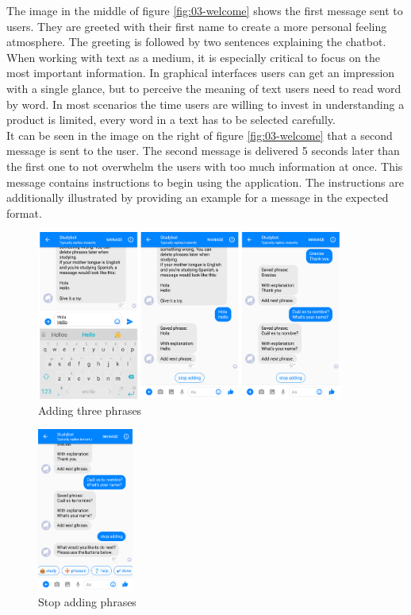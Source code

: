The image in the middle of figure \ref{fig:03-welcome} shows the first message sent to users.
They are greeted with their first name to create a more personal feeling atmosphere.
The greeting is followed by two sentences explaining the chatbot.
\\

When working with text as a medium, it is especially critical to focus on the most important information.
In graphical interfaces users can get an impression with a single glance,
but to perceive the meaning of text users need to read word by word.
In most scenarios the time users are willing to invest in understanding a product is limited,
every word in a text has to be selected carefully.
\\

It can be seen in the image on the right of figure \ref{fig:03-welcome} that a second message is sent to the user.
The second message is delivered 5 seconds later than the first one to not overwhelm the users with too much information at once.
This message contains instructions to begin using the application.
The instructions are additionally illustrated by providing an example for a message in the expected format.
\\

\begin{figure}[h]
  \centering
  \includegraphics[width=0.9\textwidth]{images/interface/04-add.png}
	\caption{Adding three phrases}
	\label{fig:04-add}
\end{figure}

\begin{figure}
  \centering
  \includegraphics[width=0.28\textwidth]{images/interface/05-stop-adding.png}
	\caption{Stop adding phrases}
	\label{fig:05-stop-adding}
\end{figure}

